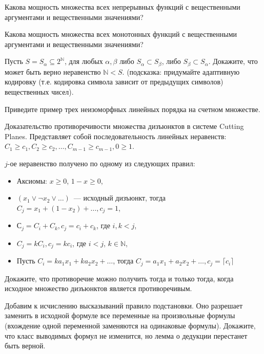 \setcounter{curtask}{15}


\begin{task}
    Какова мощность множества всех непрерывных функций с вещественными аргументами и
    вещественными значениями?
\end{task}

\begin{task}
    Какова мощность множества всех монотонных функций с вещественными аргументами и
    вещественными значениями?
\end{task}

\begin{task}
    Пусть $S = {S_{\alpha} \subseteq 2^{\mathbb{N}}}$, для любых $\alpha, \beta$ либо
    $S_{\alpha} \subset S_{\beta}$, либо $S_{\beta} \subset S_{\alpha}$. Докажите,
    что может быть верно неравенство $\mathbb{N} < S$. (подсказка: придумайте
    адаптивную кодировку (т.е. кодировка символа зависит от предыдущих символов)
    вещественных чисел). 
\end{task}

\begin{task}
    Приведите пример трех неизоморфных линейных порядка на счетном множестве.
\end{task}

\begin{task}
	Доказательство противоречивости множества дизъюнктов в системе Cutting
    Planes. Представляет собой последовательность линейных неравенств:
    $C_1 \ge c_1, C_2 \ge c_2, \dots, C_{m - 1} \ge c_{m - 1}, 0 \ge 1$.

    $j$-ое неравенство получено по одному из следующих правил:
    \begin{itemize}
        \item Аксиомы: $x \ge 0$, $1 - x \ge 0$,
	    \item $(x_1 \lor \neg x_2 \lor \dots)$~--- исходный дизъюнкт, тогда
    		$C_j = x_1 + (1 - x_2) + \dots, c_j = 1$,
        \item $С_j = C_i + C_k, c_j = c_i + c_k$, где $i, k < j$,
		\item $C_j = k C_i, c_j = k c_i$, где $i < j$, $k \in \mathbb{N}$,
        \item Пусть $C_i = k a_1 x_1 + k a_2 x_2 + \dots$, тогда $C_j = a_1 x_1 +
    		a_2 x_2 + \dots, c_j =  \lceil c_i \rceil$
        
    \end{itemize}

    Докажите, что противоречие можно получить тогда и только тогда, когда исходное
    множество дизъюнктов является противоречивым.
\end{task}

\begin{task}
    Добавим к исчислению высказываний правило подстановки. Оно разрешает заменить в
    исходной формуле все переменные на произвольные формулы (вхождение одной
    переменной заменяются на одинаковые формулы). Докажите, что класс выводимых
    формул не изменится, но лемма о дедукции перестанет быть верной. 
\end{task}